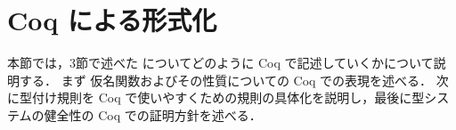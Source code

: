\section{Coq による形式化}

本節では，3節で述べた \api についてどのように Coq で記述していくかについて説明する．
まず%
仮名関数およびその性質についての Coq での表現を述べる．
次に型付け規則を Coq で使いやすくための規則の具体化を説明し，最後に型システムの健全性の Coq での証明方針を述べる．








